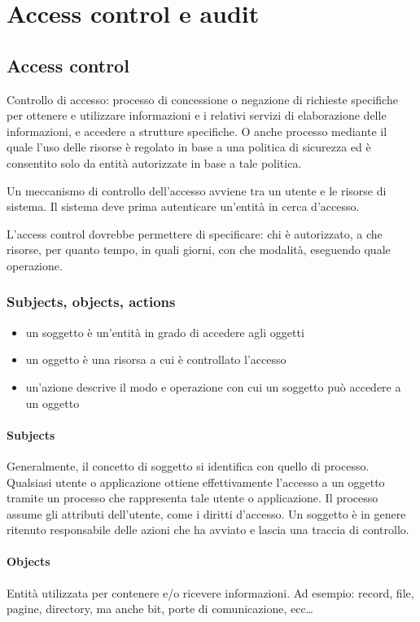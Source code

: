 \documentclass[11pt]{article}
\begin{document}
\section{Access control e audit}
\subsection{Access control}
Controllo di accesso: processo di concessione o negazione di richieste specifiche per ottenere e utilizzare informazioni 
e i relativi servizi di elaborazione delle informazioni, e accedere a strutture specifiche.
O anche processo mediante il quale l'uso delle risorse è regolato in base a una politica di sicurezza ed è consentito solo 
da entità autorizzate in base a tale politica. 

Un meccanismo di controllo dell'accesso avviene tra un utente e le risorse di sistema. Il sistema deve prima autenticare 
un'entità in cerca d'accesso.

L'access control dovrebbe permettere di specificare: chi è autorizzato, a che risorse, per quanto tempo, in quali giorni,
con che modalità, eseguendo quale operazione.
\subsubsection{Subjects, objects, actions}
\begin{itemize}
    \item un soggetto è un'entità in grado di accedere agli oggetti 
    \item un oggetto è una risorsa a cui è controllato l'accesso 
    \item un'azione descrive il modo e operazione con cui un soggetto può accedere a un oggetto 
\end{itemize}
\paragraph*{Subjects}
Generalmente, il concetto di soggetto si identifica con quello di processo. Qualsiasi utente o applicazione ottiene effettivamente 
l'accesso a un oggetto tramite un processo che rappresenta tale utente o applicazione. Il processo assume gli attributi 
dell'utente, come i diritti d'accesso. Un soggetto è in genere ritenuto responsabile delle azioni che ha avviato e lascia 
una traccia di controllo.
\paragraph*{Objects}
Entità utilizzata per contenere e/o ricevere informazioni. Ad esempio: record, file, pagine, directory, ma anche bit, porte 
di comunicazione, ecc\dots
\end{document}
